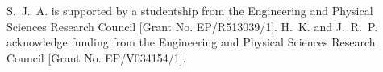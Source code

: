 \documentclass[aps,prl,twocolumn,10pt,groupedaddress]{revtex4-2}
\begin{document}
\appendix
\section{}

\begin{acknowledgments}
  S.~J.~A. is supported by a studentship from the Engineering and Physical Sciences Research Council [Grant No. EP/R513039/1].
  H.~K. and J.~R.~P. acknowledge funding from the Engineering and Physical Sciences Research Council [Grant No. EP/V034154/1].
\end{acknowledgments}



% 
\end{document}
